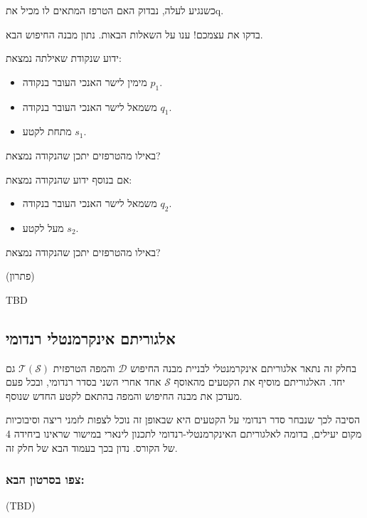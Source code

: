 \documentclass[
]{book}
\providecommand{\tightlist}{%
  \setlength{\itemsep}{0pt}\setlength{\parskip}{0pt}}
\begin{document}
כשנגיע לעלה, נבדוק האם הטרפז המתאים לו מכיל אתq.

בדקו את עצמכם!
ענו על השאלות הבאות.
נתון מבנה החיפוש הבא.

ידוע שנקודת שאילתה נמצאת:

\begin{itemize}
\tightlist
\item
  מימין לישר האנכי העובר בנקודה \(p_1\).
\item
  משמאל לישר האנכי העובר בנקודה \(q_1\).
\item
  מתחת לקטע \(s_1\).
\end{itemize}

באילו מהטרפזים יתכן שהנקודה נמצאת?

אם בנוסף ידוע שהנקודה נמצאת:

\begin{itemize}
\tightlist
\item
  משמאל לישר האנכי העובר בנקודה \(q_2\).
\item
  מעל לקטע \(s_2\).
\end{itemize}

באילו מהטרפזים יתכן שהנקודה נמצאת?

(פתרון)

TBD

\hypertarget{rand-inc-alg}{%
\subsection{אלגוריתם אינקרמנטלי רנדומי}\label{rand-inc-alg}}

בחלק זה נתאר אלגוריתם אינקרמנטלי לבניית מבנה החיפוש \(\mathcal{D}\) והמפה הטרפזית \(\mathcal{T}(\mathcal{S})\) גם יחד.
האלגוריתם מוסיף את הקטעים מהאוסף \(\mathcal{S}\) אחד אחרי השני בסדר רנדומי, ובכל פעם מעדכן את מבנה החיפוש והמפה בהתאם לקטע החדש שנוסף.

הסיבה לכך שנבחר סדר רנדומי על הקטעים היא שבאופן זה נוכל לצפות לזמני ריצה וסיבוכיות מקום יעילים, בדומה לאלגוריתם האינקרמנטלי-רנדומי לתכנון לינארי במישור שראינו ביחידה 4 של הקורס.
נדון בכך בעמוד הבא של חלק זה.

\hypertarget{ux5e6ux5e4ux5d5-ux5d1ux5e1ux5e8ux5d8ux5d5ux5df-ux5d4ux5d1ux5d0-8}{%
\subsubsection*{צפו בסרטון הבא:}\label{ux5e6ux5e4ux5d5-ux5d1ux5e1ux5e8ux5d8ux5d5ux5df-ux5d4ux5d1ux5d0-8}}

(TBD)
\end{document}
